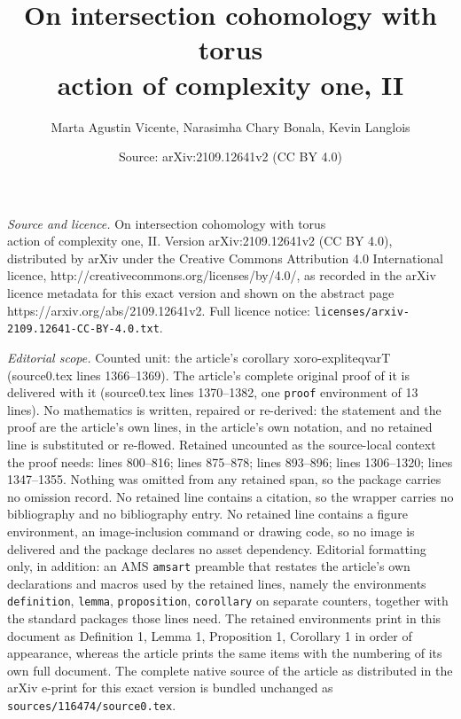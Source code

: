 \documentclass[10pt,a4paper]{amsart}
\title{On intersection cohomology with torus \\ action of complexity one, II}
\author{Marta Agustin Vicente, Narasimha Chary Bonala, Kevin Langlois}
\date{Source: arXiv:2109.12641v2 (CC BY 4.0)}
\begin{document}
\maketitle

\noindent\emph{Source and licence.} On intersection cohomology with torus \\ action of complexity one, II. Version arXiv:2109.12641v2 (CC BY 4.0), distributed by arXiv under the Creative Commons Attribution 4.0 International licence, http://creativecommons.org/licenses/by/4.0/, as recorded in the arXiv licence metadata for this exact version and shown on the abstract page https://arxiv.org/abs/2109.12641v2. Full licence notice: \texttt{licenses/arxiv-2109.12641-CC-BY-4.0.txt}.\par\smallskip

\noindent\textit{Editorial scope.} Counted unit: the article's corollary xoro-expliteqvarT (source0.tex lines 1366--1369). The article's complete original proof of it is delivered with it (source0.tex lines 1370--1382, one \texttt{proof} environment of 13 lines). No mathematics is written, repaired or re-derived: the statement and the proof are the article's own lines, in the article's own notation, and no retained line is substituted or re-flowed.  Retained uncounted as the source-local context the proof needs: lines 800--816; lines 875--878; lines 893--896; lines 1306--1320; lines 1347--1355.  Nothing was omitted from any retained span, so the package carries no omission record.  No retained line contains a citation, so the wrapper carries no bibliography and no bibliography entry.  No retained line contains a figure environment, an image-inclusion command or drawing code, so no image is delivered and the package declares no asset dependency.  Editorial formatting only, in addition: an AMS \texttt{amsart} preamble that restates the article's own declarations and macros used by the retained lines, namely the environments \texttt{definition}, \texttt{lemma}, \texttt{proposition}, \texttt{corollary} on separate counters, together with the standard packages those lines need.  The retained environments print in this document as Definition 1, Lemma 1, Proposition 1, Corollary 1 in order of appearance, whereas the article prints the same items with the numbering of its own full document.  The complete native source of the article as distributed in the arXiv e-print for this exact version is bundled unchanged as \texttt{sources/116474/source0.tex}.
\end{document}
